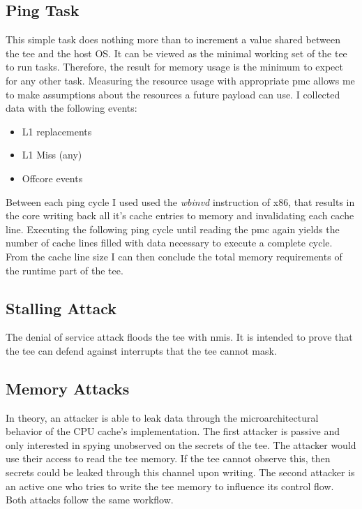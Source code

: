 \subsection{Ping Task}
\label{sec:implementation:attacks:ping}
This simple task does nothing more than to increment a value shared between the
\gls{tee} and the host OS. It can be viewed as the minimal working set of the
\gls{tee} to run tasks. Therefore, the result for memory usage is the minimum to
expect for any other task. Measuring the resource usage with appropriate
\gls{pmc} allows me to make assumptions about the resources a future payload can
use. I collected data with the following events:
\begin{itemize}
    \item L1 replacements
    \item L1 Miss (any)
    \item Offcore events 
\end{itemize}
Between each ping cycle I used used the \textit{wbinvd} instruction of x86, that
results in the core writing back all it's cache entries to memory and
invalidating each cache line. Executing the following ping cycle until reading
the \gls{pmc} again yields the number of cache lines filled with data necessary
to execute a complete cycle. From the cache line size I can then conclude the
total memory requirements of the runtime part of the \gls{tee}.

\subsection{Stalling Attack}
The denial of service attack floods the \gls{tee} with \glspl{nmi}. It is
intended to prove that the \gls{tee} can defend against interrupts that the
\gls{tee} cannot mask.


\subsection{Memory Attacks}
\label{sec:implementation:attacks:memory}
In theory, an attacker is able to leak data through the microarchitectural
behavior of the CPU cache's implementation. The first attacker is passive and
only interested in spying unobserved on the secrets of the \gls{tee}. The
attacker would use their access to read the \gls{tee} memory. If the \gls{tee}
cannot observe this, then secrets could be leaked through this channel upon
writing. The second attacker is an active one who tries to write the \gls{tee}
memory to influence its control flow. Both attacks follow the same workflow.\\

